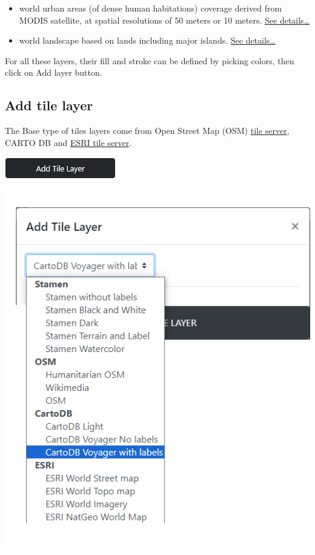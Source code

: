 \documentclass[
  letterpaper,
  DIV=11,
  numbers=noendperiod]{scrreprt}
\begin{document}
\begin{itemize}
\item
  world urban areas (of dense human habitations) coverage derived from
  MODIS satellite, at spatial resolutions of 50 meters or 10 meters.
  \href{https://www.naturalearthdata.com/downloads/50m-cultural-vectors/50m-urban-areas/}{See
  details\ldots{}}
\item
  world landscape based on lands including major islands.
  \href{https://www.naturalearthdata.com/downloads/10m-physical-vectors/10m-land/}{See
  details\ldots{}}
\end{itemize}

For all these layers, their fill and stroke can be defined by picking
colors, then click on Add layer button.

\subsection{Add tile layer}\label{add-tile-layer}

The Base type of tiles layers come from Open Street Map (OSM)
\href{https://wiki.openstreetmap.org/wiki/Tile_servers}{tile server},
CARTO DB and
\href{https://enterprise.arcgis.com/fr/server/latest/publish-services/linux/vector-tile-services.htm}{ESRI
tile server}.

\begin{center}
\includegraphics{images/Add_tyle_layer.PNG}
\end{center}

\includegraphics{images/Geo_Add_tile_layer.png}
\end{document}
